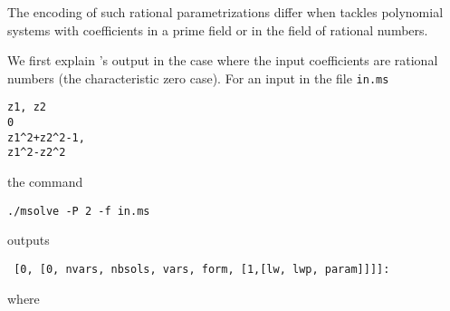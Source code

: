 \documentclass[a4paper,english,11pt]{scrartcl}
\theoremstyle{definition}
\theoremstyle{remark}
\begin{document}
The encoding of such rational parametrizations differ when \msolve tackles 
polynomial systems with coefficients in a prime field or in the field of rational 
numbers.

We first explain \msolve's output in the case where the input coefficients are 
rational numbers (the characteristic zero case).
For an input in the file \verb+in.ms+
\begin{tcolorbox}
\begin{verbatim}
z1, z2
0
z1^2+z2^2-1,
z1^2-z2^2
\end{verbatim}
\end{tcolorbox}
the command
\begin{tcolorbox}
\begin{verbatim}
./msolve -P 2 -f in.ms
\end{verbatim}
\end{tcolorbox}
\msolve outputs
\begin{verbatim}
 [0, [0, nvars, nbsols, vars, form, [1,[lw, lwp, param]]]]:
\end{verbatim}
where
\end{document}
